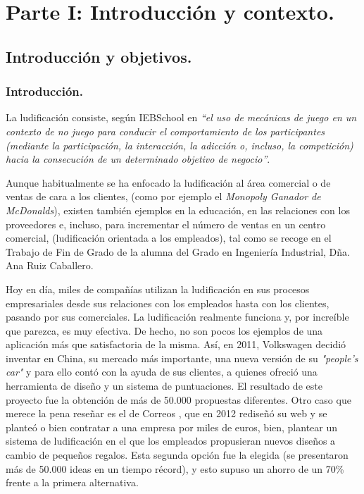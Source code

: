 \documentclass[twoside]{report}
\begin{document}
\tableofcontents

\listoffigures
 
\listoftables

\clearpage
{}
\chapter{Parte I: Introducción y contexto.}
\section{Introducción y objetivos.}

\subsection{Introducción.}

La ludificación consiste, según IEBSchool \cite{iebschoolGami} en \textit{“el uso de mecánicas de juego en un contexto de no juego para conducir el comportamiento de los participantes (mediante la participación, la interacción, la adicción o, incluso, la competición) hacia la consecución de un determinado objetivo de negocio”}. 

Aunque habitualmente se ha enfocado la ludificación al área comercial o de ventas de cara a los clientes, (como por ejemplo el \cite{monopolymcdo} \textit{Monopoly Ganador de McDonalds}), existen también ejemplos en la educación, en las relaciones con los proveedores e, incluso, para incrementar el número de ventas en un centro comercial, (ludificación orientada a los empleados), tal como se recoge en el Trabajo de Fin de Grado de la alumna del Grado en Ingeniería Industrial, \cite{anatfg} Dña. Ana Ruiz Caballero.

Hoy en día, miles de compañías utilizan la ludificación en sus procesos empresariales desde sus relaciones con los empleados hasta con los clientes, pasando por sus comerciales. La ludificación realmente funciona y, por increíble que parezca, es muy efectiva. De hecho, no son pocos los ejemplos de una aplicación más que satisfactoria de la misma. Así, en 2011, \cite{accentureGami} Volkswagen decidió inventar en China, su mercado más importante, una nueva versión de su \textit{"people’s car"} y para ello contó con la ayuda de sus clientes, a quienes ofreció una herramienta de diseño y un sistema de puntuaciones. El resultado de este proyecto fue la obtención de más de 50.000 propuestas diferentes. Otro caso que merece la pena reseñar es el de Correos \cite{confidencialcorreosgami}, que en 2012 rediseñó su web y se planteó o bien contratar a una empresa por miles de euros, bien, plantear un sistema de ludificación en el que los empleados propusieran nuevos diseños a cambio de pequeños regalos. Esta segunda opción fue la elegida (se presentaron más de 50.000 ideas en un tiempo récord), y esto supuso un ahorro de un 70\% frente a la primera alternativa. 
\end{document}
